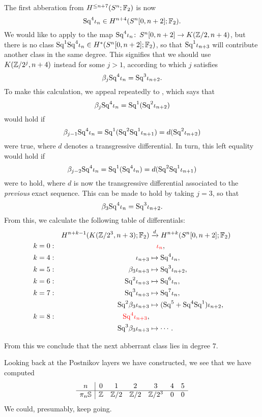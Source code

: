 The first abberation from $H^{\le n+7}(S^n; \mathbb F_2)$ is now \[\mathrm{Sq}^4 \iota_n \in H^{n+4}(S^n[0, n+2]; \mathbb F_2).\]
We would like to apply  to the map $\mathrm{Sq}^4 \iota_n\colon\thinspace S^n[0, n+2] \to K(\mathbb Z/2, n+4)$, but there is no class $\mathrm{Sq}^1 \mathrm{Sq}^4 \iota_n \in H^*(S^n[0, n+2]; \mathbb F_2)$, so that $\mathrm{Sq}^1 \iota_{n+3}$ will contribute another class in the same degree.
This signifies that we should use $K(\mathbb Z/2^j, n+4)$ instead for some $j > 1$, according to which $j$ satisfies \[\beta_j \mathrm{Sq}^4 \iota_n = \mathrm{Sq}^3 \iota_{n+2}.\]
To make this calculation, we appeal repeatedly to , which says that \[\beta_j \mathrm{Sq}^4 \iota_n = \mathrm{Sq}^1(\mathrm{Sq}^2 \iota_{n+2})\] would hold if \[\beta_{j-1} \mathrm{Sq}^4 \iota_n = \mathrm{Sq}^1(\mathrm{Sq}^2 \mathrm{Sq}^1 \iota_{n+1}) = d(\mathrm{Sq}^2 \iota_{n+2})\] were true, where $d$ denotes a transgressive differential.
In turn, this left equality would hold if \[\beta_{j-2} \mathrm{Sq}^4 \iota_n = \mathrm{Sq}^1 (\mathrm{Sq}^4 \iota_n) = d(\mathrm{Sq}^2 \mathrm{Sq}^1 \iota_{n+1})\] were to hold, where $d$ is now the transgressive differential associated to the \emph{previous} exact sequence.
This can be made to hold by taking $j = 3$, so that \[\beta_3 \mathrm{Sq}^4 \iota_n = \mathrm{Sq}^3 \iota_{n+2}.\]
From this, we calculate the following table of differentials:
\begin{align*}
& & H^{n+k-1}(K(\mathbb Z/2^3, n+3); \mathbb F_2) & \xrightarrow{d} H^{n+k}(S^n[0, n+2]; \mathbb F_2) \\
k & = 0: & & \quad \textcolor{red}{\iota_n}, \\
k & = 4: &
\iota_{n+3} & \mapsto \mathrm{Sq}^4 \iota_n, \\
k & = 5: &
\beta_3 \iota_{n+3} & \mapsto \mathrm{Sq}^3 \iota_{n+2}, \\
k & = 6: &
\mathrm{Sq}^2 \iota_{n+3} & \mapsto \mathrm{Sq}^6 \iota_n, \\
k & = 7: &
\mathrm{Sq}^3 \iota_{n+3} & \mapsto \mathrm{Sq}^7 \iota_n, \\
& & \mathrm{Sq}^2 \beta_3 \iota_{n+3} & \mapsto (\mathrm{Sq}^5 + \mathrm{Sq}^4 \mathrm{Sq}^1)\iota_{n+2}, \\
k & = 8: & \textcolor{red}{\mathrm{Sq}^4 \iota_{n+3}}, \\
& & \mathrm{Sq}^3 \beta_3 \iota_{n+3} & \mapsto \cdots.
\end{align*}

\noindent
From this we conclude that the next abberrant class lies in degree $7$.

Looking back at the Postnikov layers we have constructed, we see that we have computed
\[\begin{array}{c|ccccccc}
n & 0 & 1 & 2 & 3 & 4 & 5 \\
\hline
\pi_n \mathbb S & \mathbb Z & \mathbb Z/2 & \mathbb Z/2 & \mathbb Z/2^3 & 0 & 0
\end{array}\]
We could, presumably, keep going.

